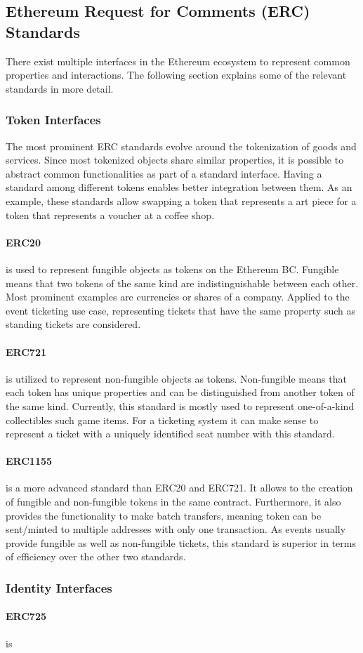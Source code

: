 \subsection{Ethereum Request for Comments (ERC) Standards}

There exist multiple interfaces in the Ethereum ecosystem to represent common properties and interactions. The following section explains some of the relevant standards in more detail. 

\subsubsection{Token Interfaces}\label{subsubsection:token-interfaces}

The most prominent ERC standards evolve around the tokenization of goods and services. Since most tokenized objects share similar properties, it is possible to abstract common functionalities as part of a standard interface. Having a standard among different tokens enables better integration between them. As an example, these standards allow swapping a token that represents a art piece for a token that represents a voucher at a coffee shop. 


\paragraph{ERC20} is used to represent fungible objects as tokens on the Ethereum BC. Fungible means that two tokens of the same kind are indistinguishable between each other. Most prominent examples are currencies or shares of a company. Applied to the event ticketing use case, representing tickets that have the same property such as standing tickets are considered.

\paragraph{ERC721} is utilized to represent non-fungible objects as tokens. Non-fungible means that each token has unique properties and can be distinguished from another token of the same kind. Currently, this standard is mostly used to represent one-of-a-kind collectibles such game items. For a ticketing system it can make sense to represent a ticket with a uniquely identified seat number with this standard. 

\paragraph{ERC1155} is a more advanced standard than ERC20 and ERC721. It allows to the creation of fungible and non-fungible tokens in the same contract. Furthermore, it also provides the functionality to make batch transfers, meaning token can be sent/minted to multiple addresses with only one transaction. As events usually provide fungible as well as non-fungible tickets, this standard is superior in terms of efficiency over the other two standards.

\subsubsection{Identity Interfaces}

\paragraph{ERC725} is
